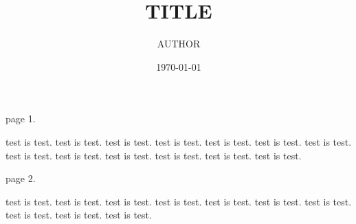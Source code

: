 \documentclass[a4paper, 12pt, twoside]{article}
\title{TITLE}
\author{AUTHOR}
\date{\today}
\begin{document}
\maketitle

\begin{abstract}
\end{abstract}

page 1.

test is test. test is test. test is test. test is test. test is test. test is test. test is test. test is test. test is test. test is test. test is test. test is test. test is test. 

\newpage 

page 2.

test is test. test is test. test is test. test is test. test is test. test is test. test is test. test is test. test is test. test is test. 
\end{document}
